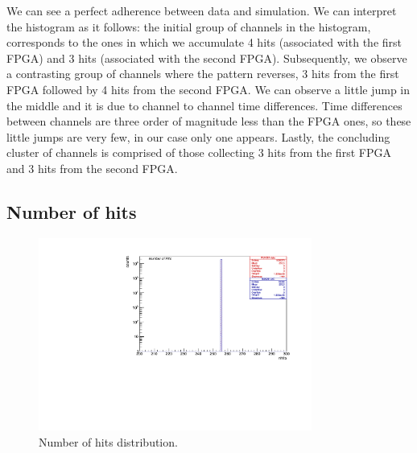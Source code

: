 We can see a perfect adherence between data and simulation. We can interpret the histogram as it follows: the initial group of channels in the histogram,
corresponds to the ones in which we accumulate 4 hits (associated with the first FPGA) and 3 hits (associated with the second FPGA). 
Subsequently, we observe a contrasting group of channels where the pattern reverses, 3 hits from the first FPGA followed by 4 hits from the second FPGA.
We can observe a little jump in the middle and it is due to channel to channel time differences.
Time differences between channels are three order of magnitude less than the FPGA ones, so these little jumps are very few, in our case only one appears.
Lastly, the concluding cluster of channels is comprised of those collecting 3 hits from the first FPGA and 3 hits from the second FPGA.



\subsection{Number of hits}
\begin{figure}[!h]
\centering
\includegraphics[width =0.8\textwidth]{figures/pdf/figure_00008_nhits_8}
\caption{Number of hits distribution.}
\label{fig:2}
\end{figure}


